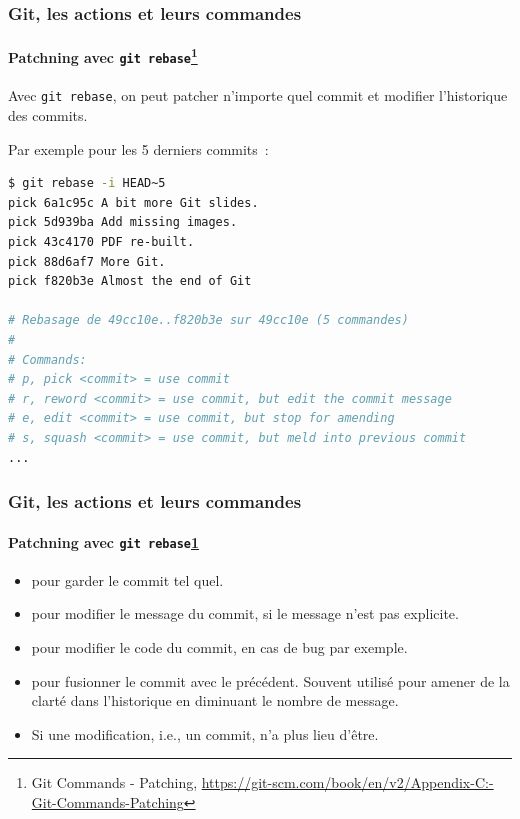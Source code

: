 \documentclass{beamer}
\begin{document}
    \begin{frame}[fragile]
        \frametitle{Git, les actions et leurs commandes}
        \framesubtitle{Patchning avec \lstinline{git rebase}\footnote{\label{progitmerge}Git Commands - Patching, \url{https://git-scm.com/book/en/v2/Appendix-C:-Git-Commands-Patching}}}
        \transdissolve
        Avec \lstinline{git rebase}, on peut patcher n'importe quel commit et modifier l'historique des commits.

        Par exemple pour les 5 derniers commits~:
        \begin{lstlisting}[language=sh]
$ git rebase -i HEAD~5
pick 6a1c95c A bit more Git slides.
pick 5d939ba Add missing images.
pick 43c4170 PDF re-built.
pick 88d6af7 More Git.
pick f820b3e Almost the end of Git

# Rebasage de 49cc10e..f820b3e sur 49cc10e (5 commandes)
#
# Commands:
# p, pick <commit> = use commit
# r, reword <commit> = use commit, but edit the commit message
# e, edit <commit> = use commit, but stop for amending
# s, squash <commit> = use commit, but meld into previous commit
...
        \end{lstlisting}
    \end{frame}

    \begin{frame}
        \frametitle{Git, les actions et leurs commandes}
        \framesubtitle{Patchning avec \lstinline{git rebase}\cref{progitmerge}}
        \transdissolve
        \begin{itemize}
            \item {} pour garder le commit tel quel.
            \item {} pour modifier le message du commit, si le message n'est pas explicite.
            \item {} pour modifier le code du commit, en cas de bug par exemple.
            \item {} pour fusionner le commit avec le précédent.
            Souvent utilisé pour amener de la clarté dans l'historique en diminuant le nombre de message.
            \item {} Si une modification, i.e., un commit, n'a plus lieu d'être.
        \end{itemize}
    \end{frame}
\end{document}
